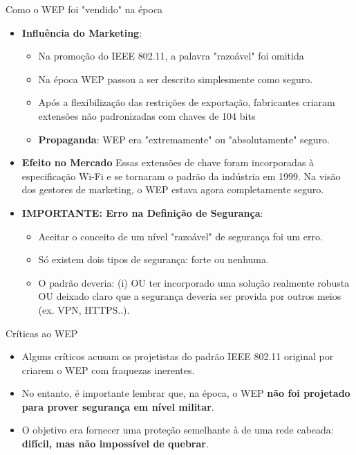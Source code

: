 \begin{frame}{Como o WEP foi "vendido" na época}
\begin{itemize}
\item \textbf{Influência do Marketing}:
\begin{itemize}
    \item Na promoção do IEEE 802.11, a palavra "razoável" foi omitida 
    \item Na época WEP passou a ser descrito simplesmente como seguro.  
    \item Após a flexibilização das restrições de exportação, fabricantes criaram extensões não padronizadas com chaves de 104 bits
\item \textbf{Propaganda}:  WEP era "extremamente" ou "absolutamente" seguro.
\end{itemize}

\item \textbf{Efeito no Mercado}
Essas extensões de chave foram incorporadas à especificação Wi-Fi e se tornaram o padrão da indústria em 1999.  
Na visão dos gestores de marketing, o WEP estava agora completamente seguro.

    \item \textbf{IMPORTANTE: Erro na Definição de Segurança}:
    \begin{itemize}
        \item Aceitar o conceito de um nível "razoável" de segurança foi um erro.  
\item Só existem dois tipos de segurança: forte ou nenhuma.  
\item O padrão deveria: (i) OU ter incorporado uma solução realmente robusta OU deixado claro que a segurança deveria ser provida por outros meios (ex. VPN, HTTPS..).
    \end{itemize}
    

\end{itemize}
\end{frame}

\begin{frame}{Críticas ao WEP}
\begin{itemize}
    \item Alguns críticos acusam os projetistas do padrão IEEE 802.11 original por criarem o WEP com fraquezas inerentes.
    \item No entanto, é importante lembrar que, na época, o WEP \textbf{não foi projetado para prover segurança em nível militar}.
    \item O objetivo era fornecer uma proteção semelhante à de uma rede cabeada: \textbf{difícil, mas não impossível de quebrar}.
\end{itemize}
\end{frame}


